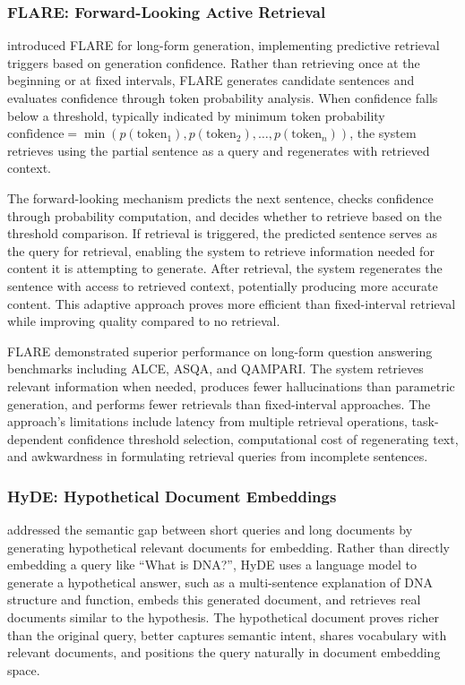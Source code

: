 \documentclass[11pt,letterpaper]{article}
\begin{document}
\subsubsection{FLARE: Forward-Looking Active Retrieval}

\cite{jiang2023active} introduced FLARE for long-form generation, implementing predictive retrieval triggers based on generation confidence. Rather than retrieving once at the beginning or at fixed intervals, FLARE generates candidate sentences and evaluates confidence through token probability analysis. When confidence falls below a threshold, typically indicated by minimum token probability $\text{confidence} = \min(p(\text{token}_1), p(\text{token}_2), \ldots, p(\text{token}_n))$, the system retrieves using the partial sentence as a query and regenerates with retrieved context.

The forward-looking mechanism predicts the next sentence, checks confidence through probability computation, and decides whether to retrieve based on the threshold comparison. If retrieval is triggered, the predicted sentence serves as the query for retrieval, enabling the system to retrieve information needed for content it is attempting to generate. After retrieval, the system regenerates the sentence with access to retrieved context, potentially producing more accurate content. This adaptive approach proves more efficient than fixed-interval retrieval while improving quality compared to no retrieval.

FLARE demonstrated superior performance on long-form question answering benchmarks including ALCE, ASQA, and QAMPARI. The system retrieves relevant information when needed, produces fewer hallucinations than parametric generation, and performs fewer retrievals than fixed-interval approaches. The approach's limitations include latency from multiple retrieval operations, task-dependent confidence threshold selection, computational cost of regenerating text, and awkwardness in formulating retrieval queries from incomplete sentences.

\subsubsection{HyDE: Hypothetical Document Embeddings}

\cite{gao2022precise} addressed the semantic gap between short queries and long documents by generating hypothetical relevant documents for embedding. Rather than directly embedding a query like ``What is DNA?'', HyDE uses a language model to generate a hypothetical answer, such as a multi-sentence explanation of DNA structure and function, embeds this generated document, and retrieves real documents similar to the hypothesis. The hypothetical document proves richer than the original query, better captures semantic intent, shares vocabulary with relevant documents, and positions the query naturally in document embedding space.
\end{document}
